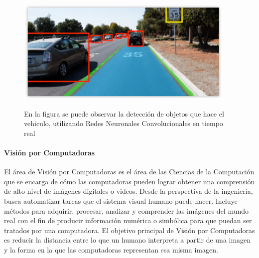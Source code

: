 \documentclass[a4paper,11pt,spanish]{book}
\begin{document}
    \begin{figure}[h]
      \includegraphics[width=0.9\linewidth]{./img/nvidia_car_detection.png}\\
      \caption{En la figura se puede observar la detección de objetos que hace el vehiculo, utilizando Redes Neuronales Convolucionales en tiempo real}
      \label{fig:car_detection}
    \end{figure}
    \paragraph{Visión por Computadoras}
      El área de Visión por Computadoras es el área de las Ciencias de la Computación que se encarga de cómo las computadoras pueden lograr obtener una comprensión de alto nivel de imágenes digitales o videos.
      Desde la perspectiva de la ingeniería, busca automatizar tareas que el sistema visual humano puede hacer. Incluye métodos para adquirir, procesar, analizar y comprender las imágenes del mundo real
      con el fin de producir información numérica o simbólica para que puedan ser tratados por una computadora. El objetivo principal de Visión por Computadoras es reducir la distancia
      entre lo que un humano interpreta a partir de una imagen y la forma en la que las computadoras representan esa misma imagen.\\
\end{document}
